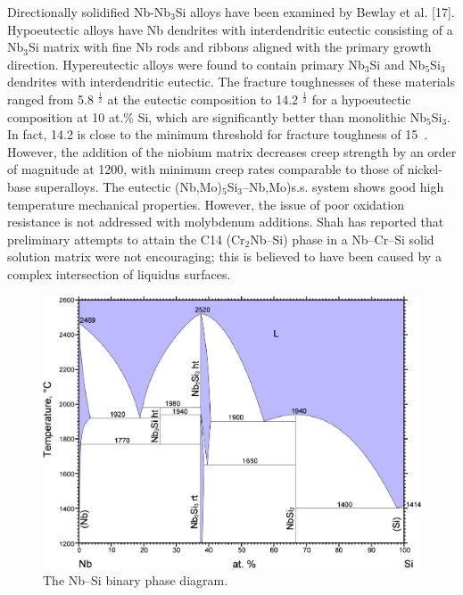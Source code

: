 Directionally solidified Nb-Nb$_3$Si alloys have been examined by Bewlay et al. [17].  Hypoeutectic alloys have Nb dendrites with interdendritic eutectic consisting of a Nb$_3$Si matrix with fine Nb rods and ribbons aligned with the primary growth direction.   Hypereutectic alloys were found to contain primary Nb$_3$Si and Nb$_5$Si$_3$ dendrites with interdendritic eutectic.  The fracture toughnesses of these materials ranged from 5.8 \mega\pascal\usk\meter$^{\frac{1}{2}}$ at the eutectic composition to 14.2 \mega\pascal\usk\meter$^{\frac{1}{2}}$ for a hypoeutectic composition at 10 at.\% Si, which are significantly better than monolithic Nb$_5$Si$_3$.  In fact, 14.2 is close to the minimum threshold for fracture toughness of 15\mega\pascal ~\cite{shah95}.   However, the addition of the niobium matrix decreases creep strength by an order of magnitude at 1200\celsius, with minimum creep rates comparable to those of nickel-base superalloys. The eutectic (Nb,Mo)$_5$Si$_3$--Nb,Mo)s.s. system shows good high temperature mechanical properties. However, the issue of poor oxidation resistance is not addressed with molybdenum additions. Shah has reported that preliminary attempts to attain the C14 (Cr$_2$Nb--Si) phase in a Nb--Cr--Si solid solution matrix were not encouraging; this is believed to have been caused by a complex intersection of liquidus surfaces. 
%
\begin{figure}[H]
\begin{center}
\includegraphics[width=.8\textwidth]{NbSi}
\vspace{-2mm}
\caption{The Nb--Si binary phase diagram.}\label{fig:NbSi}
\end{center}
\end{figure}  
%
